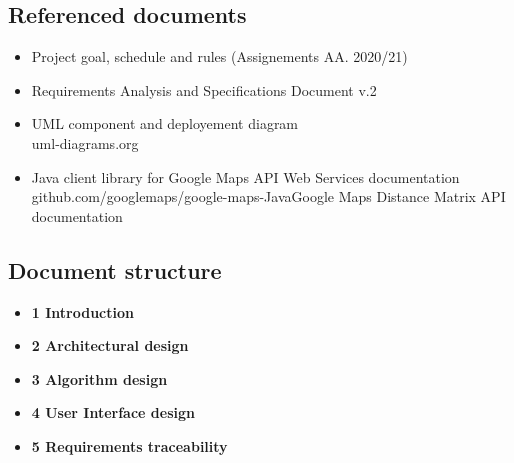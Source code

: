 \subsection{Referenced documents}
\label{subsect:referenceddocuments}
\begin{itemize}
    \item Project goal, schedule and rules (Assignements AA. 2020/21)
    \item Requirements Analysis and Specifications Document v.2
    \item UML component and deployement diagram\\
    uml-diagrams.org
    \item Java client library for Google Maps API Web Services documentation\\
    github.com/googlemaps/google-maps-JavaGoogle Maps Distance Matrix API documentation\\
\end{itemize}

\subsection{Document structure}
\label{subsect:document structure}
\begin{itemize}
    \item \textbf{1 Introduction} 
    \item \textbf{2 Architectural design}
    \item \textbf{3 Algorithm design}
    \item \textbf{4 User Interface design}
    \item \textbf{5 Requirements traceability}
\end{itemize}


